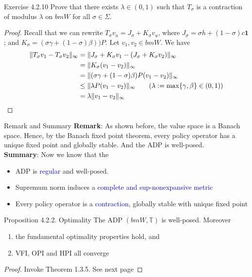 \documentclass[aspectratio=169]{beamer} %
\begin{document}
\begin{frame}{Exercise 4.2.10}
Prove that there exists $\lambda\in (0,1)$ such that $T_\sigma$ is a contraction of modulus $\lambda$ on $bmW$ for all $\sigma\in\Sigma$.
\begin{proof}
Recall that we can rewrite $T_\sigma v_u = J_\sigma + K_\sigma v_u$, where $J_\sigma  = \sigma h + (1-\sigma)c\mathbf{1}$; and $K_\sigma  = (\sigma \gamma +(1-\sigma) \beta))P$. 
    Let $v_1,v_2\in bmW$. We have
    \begin{align*}
        \|T_\sigma v_1-T_\sigma v_2\|_\infty  &=  \|J_\sigma + K_\sigma v_1- (J_\sigma+K_\sigma v_2)\|_\infty\\
        &= \|K_\sigma (v_1-v_2)\|_\infty\\
        &= \|(\sigma \gamma +(1-\sigma)\beta)P (v_1-v_2)\|_\infty\\
        &\le \|\lambda P(v_1-v_2)\|_\infty\tag{$\lambda:=\max\{\gamma,\beta\}\in(0,1)$}\\
        &= \lambda \|v_1-v_2\|_\infty
    \end{align*}
\end{proof}
\end{frame}
\begin{frame}{Remark and Summary}
\textbf{Remark}: As shown before, the value space is a Banach space. Hence, by the Banach fixed point theorem, every policy operator has a unique fixed point and globally stable. And the ADP is well-posed.\\
\textbf{Summary}: Now we know that the 
\begin{itemize}
    \item ADP is \textcolor{blue}{regular} and well-posed.
    \item Supremum norm induces a \textcolor{blue}{complete and sup-nonexpansive metric}
    \item Every policy operator is a \textcolor{blue}{contraction}, globally stable with unique fixed point
\end{itemize}
\end{frame}
\begin{frame}{Proposition 4.2.2. Optimality}
        The ADP $(bmW, \mathbb{T})$ is well-posed. Moreover
        \begin{enumerate}
            \item the fundamental optimality properties hold, and
            \item VFI, OPI and HPI all converge
        \end{enumerate}
    \begin{proof}
        Invoke Theorem 1.3.5. See next page
    \end{proof}
\end{frame}
\end{document}
